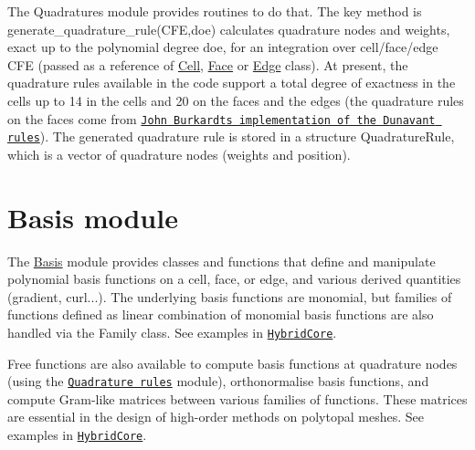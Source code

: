 The Quadratures module provides routines to do that. The key method is generate\+\_\+quadrature\+\_\+rule(C\+FE,doe) calculates quadrature nodes and weights, exact up to the polynomial degree {\ttfamily doe}, for an integration over cell/face/edge C\+FE (passed as a reference of \hyperlink{classHArDCore3D_1_1Cell}{Cell}, \hyperlink{classHArDCore3D_1_1Face}{Face} or \hyperlink{classHArDCore3D_1_1Edge}{Edge} class). At present, the quadrature rules available in the code support a total degree of exactness in the cells up to 14 in the cells and 20 on the faces and the edges (the quadrature rules on the faces come from \href{https://people.sc.fsu.edu/~jburkardt/cpp_src/triangle_dunavant_rule/triangle_dunavant_rule.html}{\tt John Burkardt\textquotesingle{}s implementation of the Dunavant rules}). The generated quadrature rule is stored in a structure Quadrature\+Rule, which is a vector of quadrature nodes (weights and position).

\label{_basis}%
 \hypertarget{index_basis_module}{}\section{Basis module}\label{index_basis_module}
The \hyperlink{group__Basis}{Basis} module provides classes and functions that define and manipulate polynomial basis functions on a cell, face, or edge, and various derived quantities (gradient, curl...). The underlying basis functions are monomial, but families of functions defined as linear combination of monomial basis functions are also handled via the {\ttfamily Family} class. See examples in \href{#hybridcore}{\tt Hybrid\+Core}.

Free functions are also available to compute basis functions at quadrature nodes (using the \href{#quad_rules}{\tt Quadrature rules} module), orthonormalise basis functions, and compute Gram-\/like matrices between various families of functions. These matrices are essential in the design of high-\/order methods on polytopal meshes. See examples in \href{#hybridcore}{\tt Hybrid\+Core}.

